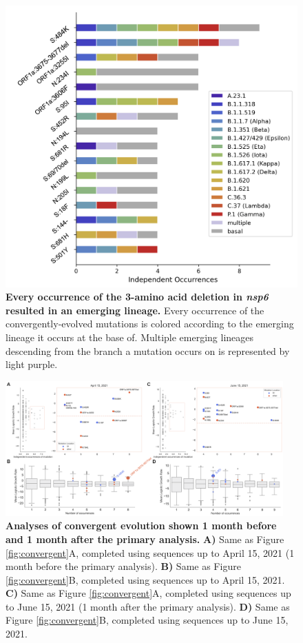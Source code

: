 \documentclass[11pt,oneside,letterpaper]{article}
\begin{document}
\begin{figure}[h!]
	\centerline{\includegraphics[scale=0.55]{fig4_supp_emerginglineages.png}}
	\caption{\textbf{Every occurrence of the 3-amino acid deletion in \emph{nsp6} resulted in an emerging lineage.}
	Every occurrence of the convergently-evolved mutations is colored according to the emerging lineage it occurs at the base of. Multiple emerging lineages descending from the branch a mutation occurs on is represented by light purple.
	}
	\label{fig:emerginglineages}
\end{figure}

\begin{figure}[h!]
	\centerline{\includegraphics[width=0.95\textwidth]{fig4_supp_convergentovertime.png}}
	\caption{\textbf{Analyses of convergent evolution shown 1 month before and 1 month after the primary analysis.}
	\textbf{A)} Same as Figure \ref{fig:convergent}A, completed using sequences up to April 15, 2021 (1 month before the primary analysis). \textbf{B)} Same as Figure \ref{fig:convergent}B, completed using sequences up to April 15, 2021. \textbf{C)} Same as Figure \ref{fig:convergent}A, completed using sequences up to June 15, 2021 (1 month after the primary analysis). \textbf{D)} Same as Figure \ref{fig:convergent}B, completed using sequences up to June 15, 2021.
	}
	\label{fig:convergentovertime}
\end{figure}
\end{document}
